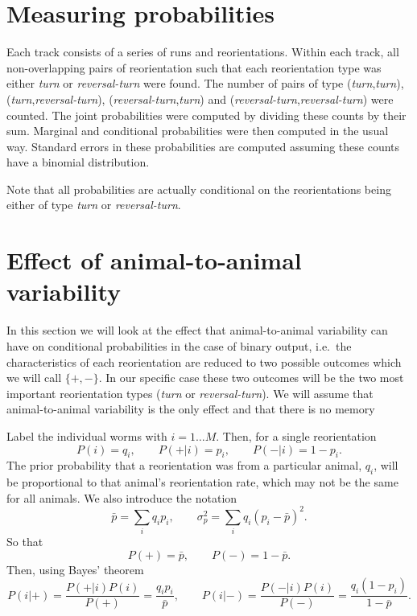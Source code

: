 \documentclass[12pt]{article}
\newcommand{\ie}{i.e.\ }
\begin{document}
\section{Measuring probabilities}\label{sec:measureprobs}

Each track consists of a series of runs and reorientations. Within each track, all non-overlapping pairs of reorientation such that each reorientation type was either \emph{turn} or \emph{reversal-turn} were found. The number of pairs of type (\emph{turn},\emph{turn}), (\emph{turn},\emph{reversal-turn}), (\emph{reversal-turn},\emph{turn}) and (\emph{reversal-turn},\emph{reversal-turn}) were counted. The joint probabilities were computed by dividing these counts by their sum. Marginal and conditional probabilities were then computed in the usual way. Standard errors in these probabilities are computed assuming these counts have a binomial distribution.

Note that all probabilities are actually conditional on the reorientations being either of type \emph{turn} or \emph{reversal-turn}.

\section{Effect of animal-to-animal variability}\label{sec:variability}

In this section we will look at the effect that animal-to-animal variability can have on conditional probabilities in the case of binary output, \ie the characteristics of each reorientation are reduced to two possible outcomes which we will call $\{+,-\}$. In our specific case these two outcomes will be the two most important reorientation types (\emph{turn} or \emph{reversal-turn}). We will assume that animal-to-animal variability is the only effect and that there is no memory

Label the individual worms with $i=1\ldots M$. Then, for a single reorientation
%
\begin{equation}\label{eq:varisinglereo}
  P(i) = q_i, \qquad
  P(+|i) = p_i, \qquad
  P(-|i) = 1-p_i.
\end{equation}
%
The prior probability that a reorientation was from a particular animal, $q_i$, will be proportional to that animal's reorientation rate, which may not be the same for all animals. We also introduce the notation
%
\begin{equation}\label{eq:varinot}
  \bar{p} = \sum_i q_i p_i, \qquad
  \sigma_p^2 = {\sum_i q_i(p_i-\bar{p})^2}.
\end{equation}
%
So that
%
\begin{equation}\label{eq:varimarg}
  P(+) = \bar{p}, \qquad P(-) = 1-\bar{p}.
\end{equation}
%
Then, using Bayes' theorem
%
\begin{equation}\label{eq:singlereobayes}
  P(i|+) = \frac{P(+|i)P(i)}{P(+)} = \frac{q_ip_i}{\bar{p}}, \qquad
  P(i|-) = \frac{P(-|i)P(i)}{P(-)} = \frac{q_i(1-p_i)}{1-\bar{p}}.
\end{equation}
%
\end{document}
